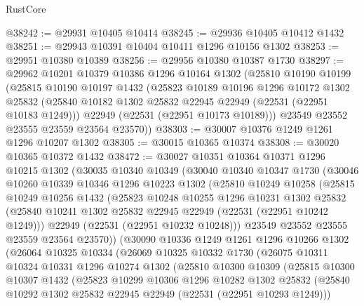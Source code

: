 \begin{lexlean}{RustCore}
\begin{coremodule}
@38242 := @29931 @10405 @10414
@38245 := @29936 @10405 @10412 @1432
@38251 := @29943 @10391 @10404 @10411 @1296 @10156 @1302
@38253 := @29951 @10380 @10389
@38256 := @29956 @10380 @10387 @1730
@38297 := @29962
    @10201
    @10379
    @10386
    @1296
    @10164
    @1302
    (@25810
      @10190
      @10199
      (@25815
        @10190
        @10197
        @1432
        (@25823
          @10189
          @10196
          @1296
          @10172
          @1302
          @25832
          (@25840 @10182 @1302 @25832 @22945 @22949 (@22531 (@22951 @10183 @1249)))
          @22949
          (@22531 (@22951 @10173 @10189)))
        @23549
        @23552
        @23555
        @23559
        @23564
        @23570))
@38303 := @30007 @10376 @1249 @1261 @1296 @10207 @1302
@38305 := @30015 @10365 @10374
@38308 := @30020 @10365 @10372 @1432
@38472 := @30027
    @10351
    @10364
    @10371
    @1296
    @10215
    @1302
    (@30035
      @10340
      @10349
      (@30040
        @10340
        @10347
        @1730
        (@30046
          @10260
          @10339
          @10346
          @1296
          @10223
          @1302
          (@25810
            @10249
            @10258
            (@25815
              @10249
              @10256
              @1432
              (@25823
                @10248
                @10255
                @1296
                @10231
                @1302
                @25832
                (@25840 @10241 @1302 @25832 @22945 @22949 (@22531 (@22951 @10242 @1249)))
                @22949
                (@22531 (@22951 @10232 @10248)))
              @23549
              @23552
              @23555
              @23559
              @23564
              @23570))
          (@30090
            @10336
            @1249
            @1261
            @1296
            @10266
            @1302
            (@26064
              @10325
              @10334
              (@26069
                @10325
                @10332
                @1730
                (@26075
                  @10311
                  @10324
                  @10331
                  @1296
                  @10274
                  @1302
                  (@25810
                    @10300
                    @10309
                    (@25815
                      @10300
                      @10307
                      @1432
                      (@25823
                        @10299
                        @10306
                        @1296
                        @10282
                        @1302
                        @25832
                        (@25840 @10292 @1302 @25832 @22945 @22949 (@22531 (@22951 @10293 @1249)))

\end{coremodule}
\end{lexlean}
